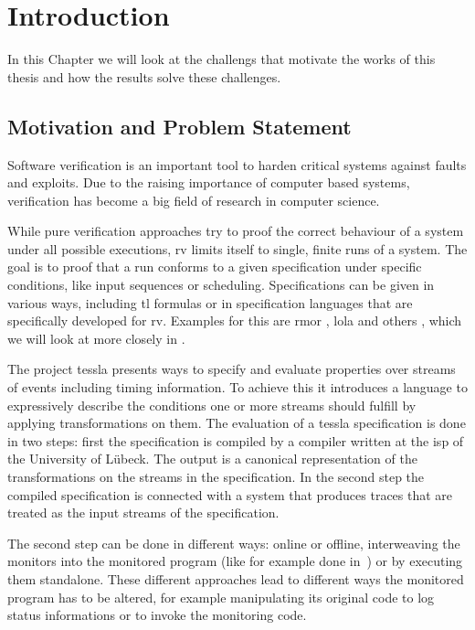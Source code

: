 %
\chapter{Introduction}
\label{sec:intro}

In this Chapter we will look at the challengs that motivate the works of this thesis and how the results solve these challenges.

\section{Motivation and Problem Statement}
\label{sec:intro:motivation}

Software verification is an important tool to harden critical systems against faults and exploits.
Due to the raising importance of computer based systems, verification has become a big field of research in computer science.

While pure verification approaches try to proof the correct behaviour of a system under all possible executions, \gls{rv} limits itself to single, finite runs of a system.
The goal is to proof that a run conforms to a given specification under specific conditions, like input sequences or scheduling.
Specifications can be given in various ways, including \gls{tl} formulas or in specification languages that are specifically developed for \gls{rv}.
Examples for this are \gls{rmor} \citep{Havelund2008}, \gls{lola} \citep{DAngelo2005} and others \citep{Zheng2015, Pike2010, Mostafa2015}, which we will look at more closely in .

The project \Gls{tessla}\citep{Decker2016} presents ways to specify and evaluate properties over streams of events including timing information.
To achieve this it introduces a language to expressively describe the conditions one or more streams should fulfill by applying transformations on them.
The evaluation of a \gls{tessla} specification is done in two steps: first the specification is compiled by a compiler written at the \gls{isp} of the University of Lübeck.
The output is a canonical representation of the transformations on the streams in the specification.
In the second step the compiled specification is connected with a system that produces traces that are treated as the input streams of the specification.

The second step can be done in different ways: online or offline, interweaving the monitors into the monitored program (like for example done in~\cite{Havelund2008}) or by executing them standalone.
These different approaches lead to different ways the monitored program has to be altered, for example manipulating its original code to log status informations or to invoke the monitoring code.

